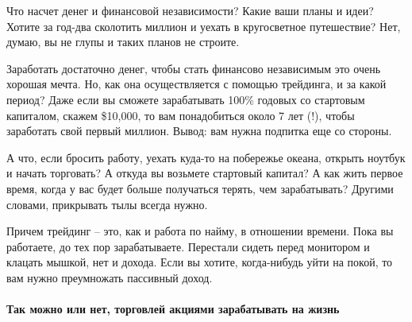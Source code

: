 \documentclass[a5paper]{article}
\begin{document}
Что насчет денег и финансовой независимости? Какие ваши планы и идеи? Хотите за год-два сколотить миллион и уехать в кругосветное путешествие? Нет, думаю, вы не глупы и таких планов не строите.

Заработать достаточно денег, чтобы стать финансово независимым это очень хорошая мечта. Но, как она осуществляется с помощью трейдинга, и за какой период? Даже если вы сможете зарабатывать 100\% годовых со стартовым капиталом, скажем \$10,000, то вам понадобиться около 7 лет (!), чтобы заработать свой первый миллион. Вывод: вам нужна подпитка еще со стороны.

А что, если бросить работу, уехать куда-то на побережье океана, открыть ноутбук и начать торговать? А откуда вы возьмете стартовый капитал? А как жить первое время, когда у вас будет больше получаться терять, чем зарабатывать? Другими словами, прикрывать тылы всегда нужно.

Причем трейдинг – это, как и работа по найму, в отношении
времени. Пока вы работаете, до тех пор зарабатываете. Перестали сидеть
перед монитором и клацать мышкой, нет и дохода. Если вы хотите,
когда-нибудь уйти на покой, то вам нужно преумножать пассивный доход.

\paragraph{Так можно или нет, торговлей акциями зарабатывать на жизнь}
\end{document}
